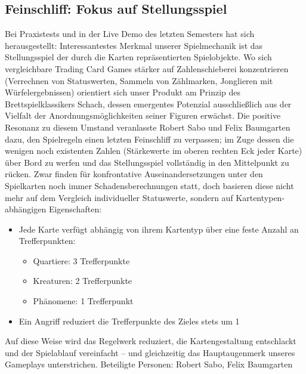 \subsection{Feinschliff: Fokus auf Stellungsspiel}
Bei Praxistests und in der Live Demo des letzten Semesters hat sich herausgestellt: Interessantestes Merkmal unserer Spielmechanik ist das Stellungsspiel der durch die Karten repräsentierten Spielobjekte.
Wo sich vergleichbare Trading Card Games stärker auf Zahlenschieberei konzentrieren (Verrechnen von Statuswerten, Sammeln von Zählmarken, Jonglieren mit Würfelergebnissen) orientiert sich unser Produkt am Prinzip des Brettspielklassikers Schach, dessen emergentes Potenzial ausschließlich aus der Vielfalt der Anordnungsmöglichkeiten seiner Figuren erwächst.
Die positive Resonanz zu diesem Umstand veranlasste Robert Sabo und Felix Baumgarten dazu, den Spielregeln einen letzten Feinschliff zu verpassen; im Zuge dessen die wenigen noch existenten Zahlen (Stärkewerte im oberen rechten Eck jeder Karte) über Bord zu werfen und das Stellungsspiel vollständig in den Mittelpunkt zu rücken. Zwar finden für konfrontative Auseinandersetzungen unter den Spielkarten noch immer Schadensberechnungen statt, doch basieren diese nicht mehr auf dem Vergleich individueller Statuswerte, sondern auf Kartentypen-abhängigen Eigenschaften:
\begin{itemize}
\item Jede Karte verfügt abhängig von ihrem Kartentyp über eine feste Anzahl an Trefferpunkten:
\begin{itemize}
\item Quartiere: 3 Trefferpunkte
\item Kreaturen: 2 Trefferpunkte
\item Phänomene: 1 Trefferpunkt
\end{itemize}
\item Ein Angriff reduziert die Trefferpunkte des Zieles stets um 1
\end{itemize}
Auf diese Weise wird das Regelwerk reduziert, die Kartengestaltung entschlackt und der Spielablauf vereinfacht – und gleichzeitig das Hauptaugenmerk unseres Gameplays unterstrichen.
Beteiligte Personen: Robert Sabo, Felix Baumgarten
